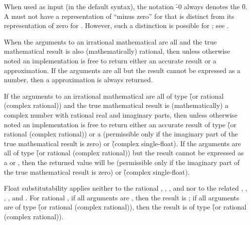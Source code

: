 When used as input (in the default syntax),
the notation \f{-0} always denotes the  \f{0}.
A  must not have a
representation of ``minus zero'' for 
that is distinct from its representation of zero for .
However, such a distinction is possible for ; 
see .

\endsubsubsection%


When the arguments to an irrational mathematical  
are all  and the true mathematical result
is also (mathematically) rational, then unless otherwise noted
an implementation is free to return either an accurate
 result
or a  approximation.
If the arguments are all  
but the result cannot be expressed
as a  number, then a  
approximation is always returned.

If the arguments to 
an irrational
mathematical  are all of type
  \f{(or rational (complex rational))} 
and the true mathematical result is
  (mathematically) a complex number with rational real and imaginary
  parts, then unless otherwise noted an implementation is free to return
  either an accurate result of type \f{(or rational (complex rational))} 
or
  a 
  (permissible only if the imaginary part of the true mathematical
  result is zero) or \f{(complex single-float)}. If the arguments are
  all of type \f{(or rational (complex rational))}
but the result cannot be
  expressed as a  or ,
then the returned
  value will be  
(permissible only if the imaginary
  part of the true mathematical result is zero) or \f{(complex single-float)}.
 
Float substitutability applies neither to the rational  
      \funref{+},
      \funref{-},
      \funref{*},
  and \funref{/} 
nor to the related  
      ,
      ,
      ,
      ,
  and .
For rational ,
  if all arguments are ,
    then the result is ; 
  if all arguments are of type \f{(or rational (complex rational))},
    then the result is of type \f{(or rational (complex rational))}.

